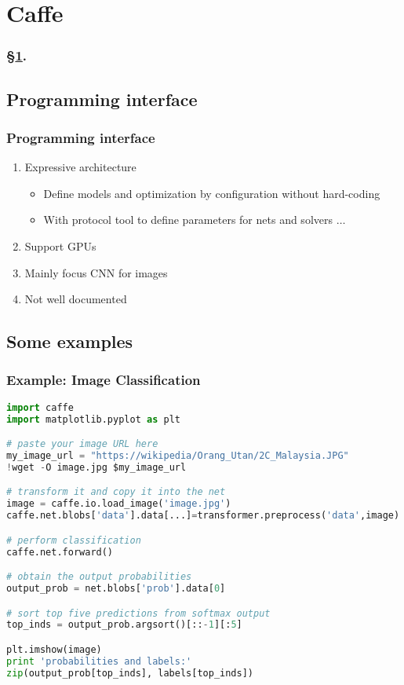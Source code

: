 
\section{Caffe}\label{sec:Caffe}


\frameinlbffalse

\begin{frame}[plain]
\frametitle{\S\ref{sec:Caffe}. \insertsection}
\listofframes
\end{frame}
\addtocounter{framenumber}{-1} %

\frameinlbftrue

\subsection{Programming interface}

\begin{frame}
  \MyLogo
  \frametitle{Programming interface}  

\begin{enumerate}
\item Expressive architecture 
\begin{itemize}
\item Define models and optimization by configuration without hard-coding
\item With protocol tool to define parameters for nets and solvers $\ldots$
\end{itemize}
\item Support GPUs 
\item Mainly focus CNN for images
\item Not well documented
\end{enumerate}
\end{frame}

\subsection{Some examples}
\begin{frame}[fragile]
  \MyLogo
  \frametitle{Example: Image Classification}  

\begin{lstlisting}[language=python]
import caffe
import matplotlib.pyplot as plt

# paste your image URL here
my_image_url = "https://wikipedia/Orang_Utan/2C_Malaysia.JPG"
!wget -O image.jpg $my_image_url

# transform it and copy it into the net
image = caffe.io.load_image('image.jpg')
caffe.net.blobs['data'].data[...]=transformer.preprocess('data',image)

# perform classification
caffe.net.forward()

# obtain the output probabilities
output_prob = net.blobs['prob'].data[0]

# sort top five predictions from softmax output
top_inds = output_prob.argsort()[::-1][:5]

plt.imshow(image)
print 'probabilities and labels:'
zip(output_prob[top_inds], labels[top_inds])\end{lstlisting}
\end{frame}


